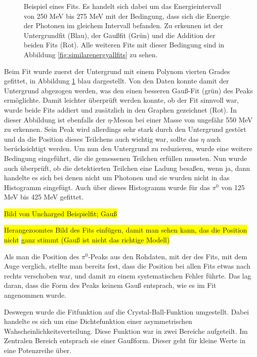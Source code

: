\documentclass[a4paper,11pt,oneside,final,german,openbib,pdftex]{scrbook}
\begin{document}
{\begin{figure}[h!]
\begin{center}
		\caption{Beispiel eines Fits. Es handelt sich dabei um das Energieintervall von 250 MeV bis 275 MeV mit der Bedingung, dass sich die Energie der Photonen im gleichem Intervall befanden.
		Zu erkennen ist der Untergrundfit (Blau), der Gau{\ss}fit (Gr\"un) und die Addition der beiden Fits (Rot). Alle weiteren Fits mit dieser Bedingung sind in Abbildung \ref{fig:similarenergyallfits} zu sehen.
	}
		\label{fig:fitexampleenergyinterval0903}	
	\end{center}
\end{figure}

 Beim Fit wurde zuerst der Untergrund mit einem Polynom vierten Grades gefittet, in Abbildung \ref{fig:fitexampleenergyinterval0903} blau dargestellt. Von den Daten konnte damit der Untergrund abgezogen werden, was den einen besseren Gauß-Fit (grün) des Peaks ermöglichte. Damit leichter \"uberpr\"uft werden konnte, ob der Fit sinnvoll war, wurde beide Fits addiert und zus\"atzlich in den Graphen gezeichnet (Rot). In dieser Abbildung ist ebenfalls der $\eta$-Meson bei einer Masse von ungef\"ahr 550 MeV zu erkennen. Sein Peak wird allerdings sehr stark durch den Untergrund gest\"ort und da die Position dieses Teilchens auch wichtig war, sollte das $\eta$ auch ber\'ucksichtigt werden. Um nun den Untergrund zu reduzieren, wurde eine weitere Bedingung eingef\"uhrt, die die gemessenen Teilchen erf\"ullen mussten. Nun wurde auch \"uberpr\"uft, ob die detektierten Teilchen eine Ladung besa{\ss}en, wenn ja, dann handelte es sich bei denen nicht um Photonen und sie wurden nicht in das Histogramm eingef\"ugt. Auch \"uber dieses Histogramm wurde f\"ur das $\pi^0$ von 125 MeV bis 425 MeV gefittet.
 
 \colorbox{yellow}{Bild von Uncharged Beispielfit; Gau{\ss}}

 \colorbox{yellow}{Herangezoomtes Bild des Fits einf\"ugen, damit man sehen kann, das die Position nicht}
 \colorbox{yellow}{ganz stimmt (Gau{\ss} ist nicht das richtige Modell)}

Als man die Position des $\pi^0$-Peaks aus den Rohdaten, mit der des Fits, mit dem Auge verglich, stellte man bereits fest, dass die Position bei allen Fits etwas nach rechts verschoben war, und damit zu einem systematischen Fehler f\"uhrte. Das lag daran, dass die Form des Peaks keinem Gau{\ss} entsprach, wie es im Fit angenommen wurde.

Deswegen wurde die Fitfunktion auf die Crystal-Ball-Funktion umgestellt. Dabei handelte es sich um eine Dichtefunktion einer asymmetrischen Wahscheinlichkeitsverteilung. Diese Funktion war in zwei Bereiche aufgeteilt. Im Zentralen Bereich entsprach sie einer Gau{\ss}form. Dieser geht f\"ur kleine Werte in eine Potenzreihe \"uber.

}
\end{document}
